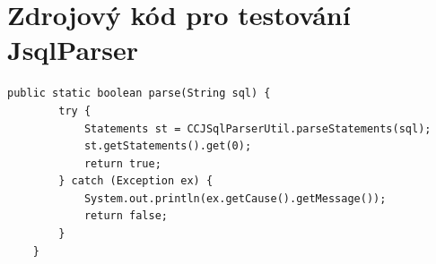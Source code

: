 \documentclass[czech,bachelor,public,dept460,male,cpdeclaration,twoside]{diploma}
\begin{document}
\section{Zdrojový kód pro testování JsqlParser}
\begin{lstlisting}[caption=ANTRL JSQL]
    public static boolean parse(String sql) {
        try {
            Statements st = CCJSqlParserUtil.parseStatements(sql);
            st.getStatements().get(0);
            return true;
        } catch (Exception ex) {
            System.out.println(ex.getCause().getMessage());
            return false;
        }
    }
\end{lstlisting}
\end{document}
